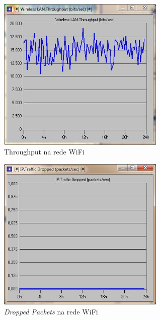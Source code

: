 \documentclass[brazil,times,12pt]{abnt}
\begin{document}
\begin{figure}[htp]
\begin{center}
  \includegraphics[width=80mm]{SimulacaoRede/ThroughputWifi.jpg}
  \caption[throughput-wifi]{Throughput na rede WiFi}
  \label{throughput-wifi}
\end{center}
\end{figure}

\begin{figure}[htp]
\begin{center}
  \includegraphics[width=80mm]{SimulacaoRede/TrafegoDropped.jpg}
  \caption[dropped-wifi]{\emph{Dropped Packets} na rede WiFi}
  \label{dropped-wifi}
\end{center}
\end{figure}
\end{document}
